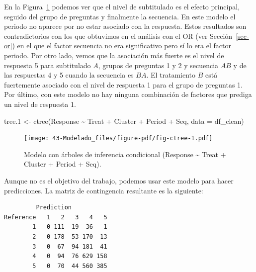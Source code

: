 \documentclass[
  12pt,
  a4paper,
  extrafontsizes,
  onecolumn,
  openright]{memoir}
\newenvironment{Shaded}{\begin{snugshade}}{\end{snugshade}}
\newcommand{\AttributeTok}[1]{\textcolor[rgb]{0.40,0.45,0.13}{#1}}
\newcommand{\FloatTok}[1]{\textcolor[rgb]{0.68,0.00,0.00}{#1}}
\newcommand{\FunctionTok}[1]{\textcolor[rgb]{0.28,0.35,0.67}{#1}}
\newcommand{\NormalTok}[1]{\textcolor[rgb]{0.00,0.23,0.31}{#1}}
\newcommand{\OtherTok}[1]{\textcolor[rgb]{0.00,0.23,0.31}{#1}}
\newcommand{\SpecialCharTok}[1]{\textcolor[rgb]{0.37,0.37,0.37}{#1}}
\begin{document}
En la Figura~\ref{fig-ctree} podemos ver que el nivel de subtitulado es
el efecto principal, seguido del grupo de preguntas y finalmente la
secuencia. En este modelo el periodo no aparece por no estar asociado
con la respuesta. Estos resultados son contradictorios con los que
obtuvimos en el análisis con el OR (ver Sección~\ref{sec-or}) en el que
el factor secuencia no era significativo pero sí lo era el factor
periodo. Por otro lado, vemos que la asociación más fuerte es el nivel
de respuesta 5 para subtitulado \(A\), grupos de preguntas 1 y 2 y
secuencia \(AB\) y de las respuestas 4 y 5 cuando la secuencia es
\(BA\). El tratamiento \(B\) está fuertemente asociado con el nivel de
respuesta 1 para el grupo de preguntas 1. Por último, con este modelo no
hay ninguna combinación de factores que prediga un nivel de respuesta 1.

\scriptsize

\begin{Shaded}
\begin{Highlighting}[]
\NormalTok{tree}\FloatTok{.1} \OtherTok{\textless{}{-}} \FunctionTok{ctree}\NormalTok{(Response }\SpecialCharTok{\textasciitilde{}}\NormalTok{ Treat }\SpecialCharTok{+}\NormalTok{ Cluster }\SpecialCharTok{+}\NormalTok{ Period }\SpecialCharTok{+}\NormalTok{ Seq, }\AttributeTok{data =}\NormalTok{ df\_clean)}
\end{Highlighting}
\end{Shaded}

\normalsize

\begin{figure}[h]

{\centering \texttt{[image: 43-Modelado\_files/figure-pdf/fig-ctree-1.pdf]}

}

\caption{\label{fig-ctree}Modelo con árboles de inferencia condicional
(Response \textasciitilde{} Treat + Cluster + Period + Seq).}

\end{figure}

Aunque no es el objetivo del trabajo, podemos usar este modelo para
hacer predicciones. La matriz de contingencia resultante es la
siguiente:

\scriptsize

\begin{verbatim}
         Prediction
Reference   1   2   3   4   5
        1   0 111  19  36   1
        2   0 178  53 170  13
        3   0  67  94 181  41
        4   0  94  76 629 158
        5   0  70  44 560 385
\end{verbatim}
\end{document}

